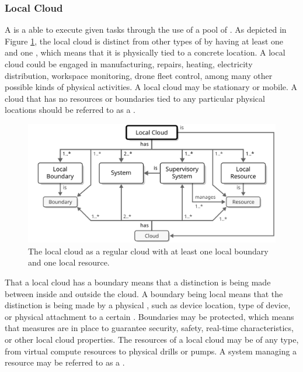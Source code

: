 \subsubsection{Local Cloud}
\label{sec:reference-model:system-of-systems:local-cloud}

A  is a  able to execute given tasks through the use of a pool of .
As depicted in Figure \ref{fig:local-cloud}, the local cloud is distinct from other types of  by having at least one  and one , which means that it is physically tied to a concrete location.
A local cloud could be engaged in manufacturing, repairs, heating, electricity distribution, workspace monitoring, drone fleet control, among many other possible kinds of physical activities.
A local cloud may be stationary or mobile.
A cloud that has no resources or boundaries tied to any particular physical locations should be referred to as a .

\begin{figure}[ht!]
  \centering
  \includegraphics[scale=0.9]{figures/local-cloud}
  \caption{
    The local cloud as a regular cloud with at least one local boundary and one local resource.
  }
  \label{fig:local-cloud}
\end{figure}

That a local cloud has a boundary means that a distinction is being made between  inside and outside the cloud.
A boundary being local means that the distinction is being made by a physical , such as device location, type of device, or physical attachment to a certain .
Boundaries may be protected, which means that measures are in place to guarantee security, safety, real-time characteristics, or other local cloud properties.
The resources of a local cloud may be of any type, from virtual compute resources to physical drills or pumps.
A system managing a resource may be referred to as a .

